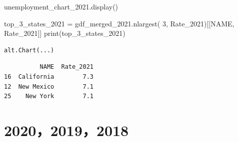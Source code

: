 \documentclass[
  letterpaper,
  DIV=11,
  numbers=noendperiod]{scrartcl}
\newenvironment{Shaded}{\begin{snugshade}}{\end{snugshade}}
\newcommand{\BuiltInTok}[1]{\textcolor[rgb]{0.00,0.23,0.31}{#1}}
\newcommand{\DecValTok}[1]{\textcolor[rgb]{0.68,0.00,0.00}{#1}}
\newcommand{\NormalTok}[1]{\textcolor[rgb]{0.00,0.23,0.31}{#1}}
\newcommand{\OperatorTok}[1]{\textcolor[rgb]{0.37,0.37,0.37}{#1}}
\newcommand{\StringTok}[1]{\textcolor[rgb]{0.13,0.47,0.30}{#1}}
\begin{document}
\begin{Shaded}
\begin{Highlighting}[]
\NormalTok{unemployment\_chart\_2021.display()}

\NormalTok{top\_3\_states\_2021 }\OperatorTok{=}\NormalTok{ gdf\_merged\_2021.nlargest(}
    \DecValTok{3}\NormalTok{, }\StringTok{\textquotesingle{}Rate\_2021\textquotesingle{}}\NormalTok{)[[}\StringTok{\textquotesingle{}NAME\textquotesingle{}}\NormalTok{, }\StringTok{\textquotesingle{}Rate\_2021\textquotesingle{}}\NormalTok{]]}
\BuiltInTok{print}\NormalTok{(top\_3\_states\_2021)}
\end{Highlighting}
\end{Shaded}

\begin{verbatim}
alt.Chart(...)
\end{verbatim}

\begin{verbatim}
          NAME  Rate_2021
16  California        7.3
12  New Mexico        7.1
25    New York        7.1
\end{verbatim}

\section{2020，2019，2018}\label{section-4}
\end{document}
